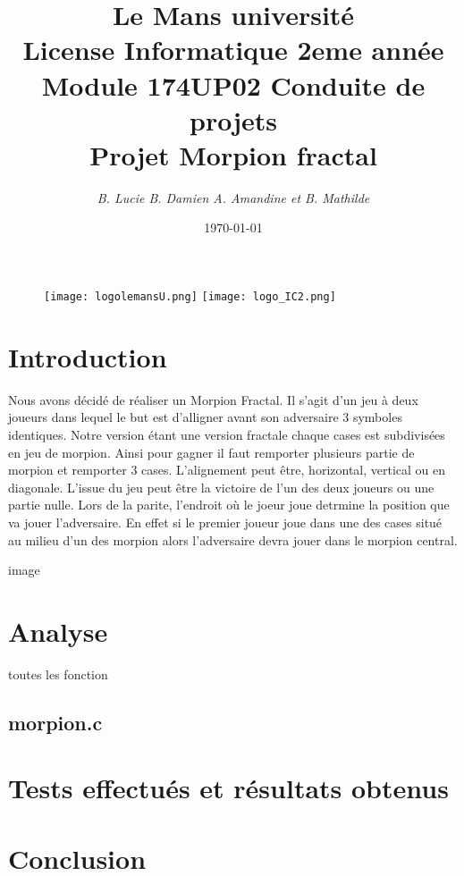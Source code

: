 \documentclass[12pt,a4paper]{article}
\begin{document}
\begin{figure}[t]
 \begin{center}
 \texttt{[image: logolemansU.png]}
\hfill
 \texttt{[image: logo\_IC2.png]}
 \end{center}
 \end{figure}
\title{\color{blue}Le Mans université \\\color{black} License Informatique 2eme année\\ Module 174UP02 Conduite de projets\\\textbf {Projet Morpion fractal}}
\author{\textit{B. Lucie B. Damien A. Amandine et B. Mathilde}}
\date{\today}
\maketitle
\color{black}
\newpage
\tableofcontents
    \newpage
    \section{Introduction}
    Nous avons décidé de réaliser un Morpion Fractal. Il s'agit d'un jeu à deux joueurs dans lequel le but est d'alligner avant son adversaire 3 symboles identiques. Notre version étant une version fractale chaque cases est subdivisées en jeu de morpion. Ainsi pour gagner il faut remporter plusieurs partie de morpion et remporter 3 cases. L'alignement peut être, horizontal, vertical ou en diagonale. L'issue du jeu peut être la victoire de l'un des deux joueurs ou une partie nulle.
    Lors de la parite, l'endroit où le joeur joue detrmine la position que va jouer l'adversaire. En effet si le premier joueur joue dans une des cases situé au milieu d'un des morpion alors l'adversaire devra jouer dans le morpion central.

    image 

    \section{Analyse}
        toutes les fonction 
    \subsection{morpion.c}
    

    \section{Tests effectués et résultats obtenus}


    \section{Conclusion}
\end{document}
